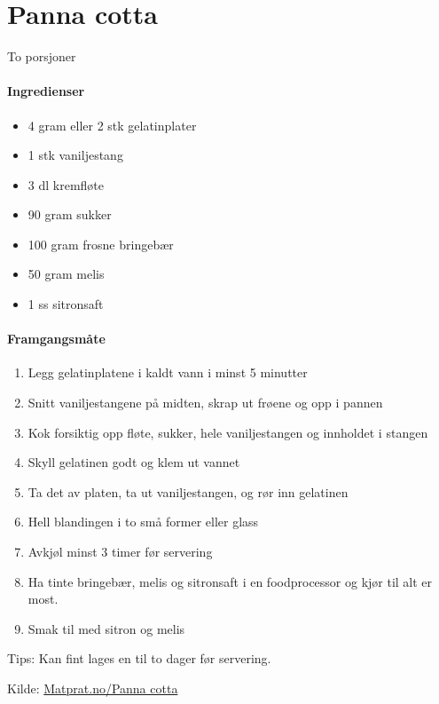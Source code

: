 \section{﻿Panna cotta}
\label{pannacotta}
To porsjoner

\paragraph{Ingredienser}
\begin{itemize}[noitemsep]
	\item 4 gram eller 2 stk gelatinplater
	\item 1 stk vaniljestang
	\item 3 dl kremfløte
	\item 90 gram sukker
	\item 100 gram frosne bringebær
	\item 50 gram melis
	\item 1 ss sitronsaft
\end{itemize}

\paragraph{Framgangsmåte}
\begin{enumerate}[noitemsep]
	\item Legg gelatinplatene i kaldt vann i minst 5 minutter
	\item Snitt vaniljestangene på midten, skrap ut frøene og opp i pannen
	\item Kok forsiktig opp fløte, sukker, hele vaniljestangen og innholdet i stangen
	\item Skyll gelatinen godt og klem ut vannet
	\item Ta det av platen, ta ut vaniljestangen, og rør inn gelatinen
	\item Hell blandingen i to små former eller glass
	\item Avkjøl minst 3 timer før servering
	\item Ha tinte bringebær, melis og sitronsaft i en foodprocessor og kjør til alt er most.
	\item Smak til med sitron og melis
\end{enumerate}

Tips: Kan fint lages en til to dager før servering.


Kilde: \href{http://www.matprat.no/gjester/gjesteoppskrifter/panna-cotta/}{Matprat.no/Panna cotta}
